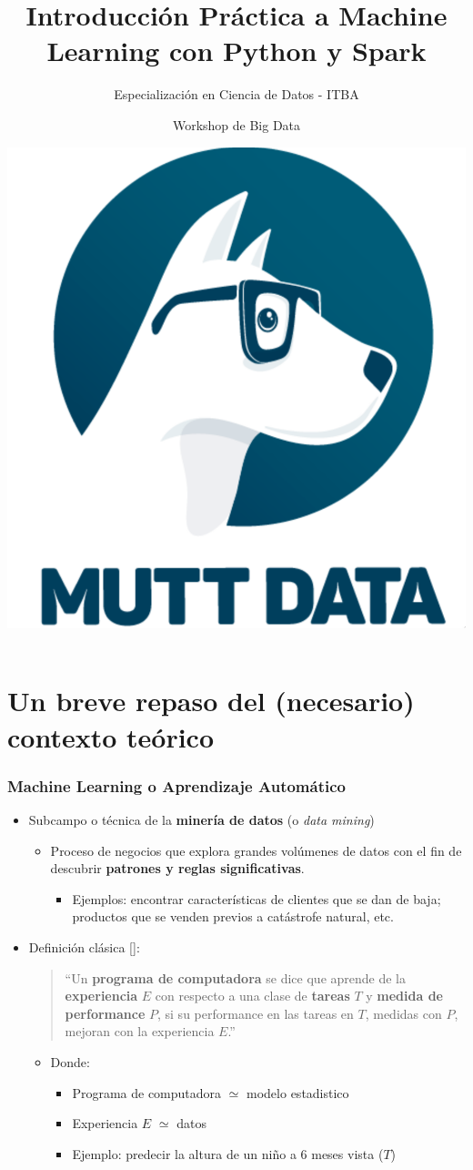\documentclass[leqno, 10pt, envcountsect]{beamer}
\title[Intro ML Python]{Introducción Práctica a Machine Learning con Python y
Spark}
\subtitle{Especialización en Ciencia de Datos - ITBA}
\author[]{Workshop de Big Data}
\institute[]{8 de Abril de 2020}
\date[]{\includegraphics[scale=0.07]{logo_mutt.png}}
\numberwithin{equation}{section}
\theoremstyle{definition}
\theoremstyle{example}
\numberwithin{figure}{section}
\numberwithin{table}{section}
\let\olditem\item
\renewcommand{\item}{%
\olditem\vspace{1pt}}
\begin{document}
\frame[plain]{\titlepage}

\section{Un breve repaso del (necesario) contexto teórico}
\label{sec:un_poco_de_contexto_teorico}

\begin{frame}[fragile=singleslide]
  \frametitle{Machine Learning o Aprendizaje Automático}
  \begin{itemize}
    \item Subcampo o técnica de la \textbf{minería de datos} (o \textit{data mining})
      \begin{itemize}
        \item Proceso de negocios que explora grandes volúmenes de datos con el
          fin de descubrir \textbf{patrones y reglas significativas}.
        \begin{itemize}
          \item Ejemplos: encontrar características de clientes que se dan de
            baja; productos que se venden previos a catástrofe natural, etc.
        \end{itemize}
      \end{itemize}

    \item Definición clásica [\textcite{mitchell97}]:\\
    \begin{quote}
      \enquote{Un \textbf{programa de computadora} se dice que aprende de la
      \textbf{experiencia} $E$ con respecto a una clase de \textbf{tareas} $T$ y
      \textbf{medida de performance} $P$, si su performance en las tareas en
      $T$, medidas con $P$, mejoran con la experiencia $E$.}
    \end{quote}
    \begin{itemize}
      \item Donde:
        \begin{itemize}
      \item Programa de computadora $\simeq$ modelo estadistico
      \item Experiencia $E$ $\simeq$ datos
      \item Ejemplo: predecir la altura de un niño a 6 meses vista ($T$)
      \end{itemize}
    \end{itemize}
  \end{itemize}
\end{frame}
\end{document}
